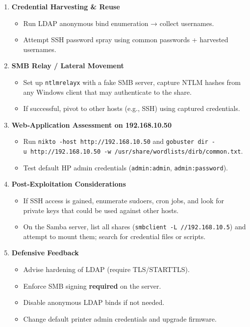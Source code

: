 \begin{enumerate}
\def\labelenumi{\arabic{enumi}.}
\tightlist
\item
  \textbf{Credential Harvesting \& Reuse}

  \begin{itemize}
  \tightlist
  \item
    Run LDAP anonymous bind enumeration → collect usernames.
  \item
    Attempt SSH password spray using common passwords + harvested
    usernames.
  \end{itemize}
\item
  \textbf{SMB Relay / Lateral Movement}

  \begin{itemize}
  \tightlist
  \item
    Set up \texttt{ntlmrelayx} with a fake SMB server, capture NTLM
    hashes from any Windows client that may authenticate to the share.
  \item
    If successful, pivot to other hosts (e.g., SSH) using captured
    credentials.
  \end{itemize}
\item
  \textbf{Web‑Application Assessment on 192.168.10.50}

  \begin{itemize}
  \tightlist
  \item
    Run \texttt{nikto\ -host\ http://192.168.10.50} and
    \texttt{gobuster\ dir\ -u\ http://192.168.10.50\ -w\ /usr/share/wordlists/dirb/common.txt}.
  \item
    Test default HP admin credentials (\texttt{admin:admin},
    \texttt{admin:password}).
  \end{itemize}
\item
  \textbf{Post‑Exploitation Considerations}

  \begin{itemize}
  \tightlist
  \item
    If SSH access is gained, enumerate sudoers, cron jobs, and look for
    private keys that could be used against other hosts.
  \item
    On the Samba server, list all shares
    (\texttt{smbclient\ -L\ //192.168.10.5}) and attempt to mount them;
    search for credential files or scripts.
  \end{itemize}
\item
  \textbf{Defensive Feedback}

  \begin{itemize}
  \tightlist
  \item
    Advise hardening of LDAP (require TLS/STARTTLS).
  \item
    Enforce SMB signing \textbf{required} on the server.
  \item
    Disable anonymous LDAP binds if not needed.
  \item
    Change default printer admin credentials and upgrade firmware.
  \end{itemize}
\end{enumerate}


